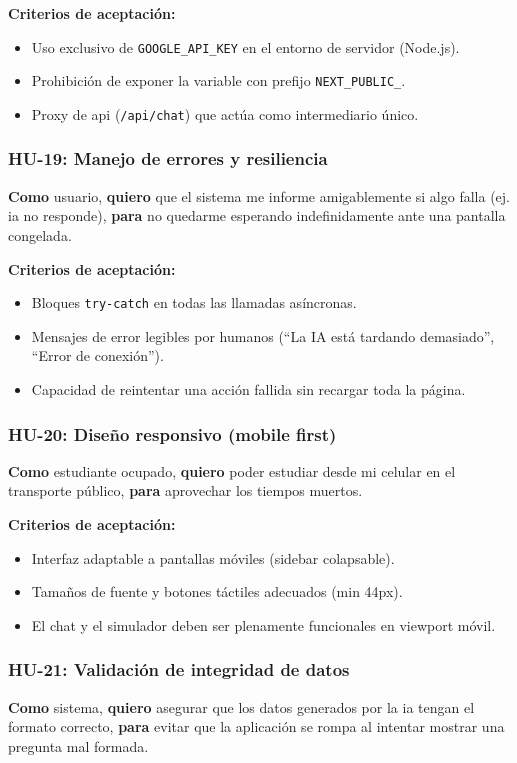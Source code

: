 \textbf{Criterios de aceptación:}
\begin{itemize}
\item Uso exclusivo de \texttt{GOOGLE\_API\_KEY} en el entorno de servidor (Node.js).
\item Prohibición de exponer la variable con prefijo \texttt{NEXT\_PUBLIC\_}.
\item Proxy de \gls{api} (\texttt{/api/chat}) que actúa como intermediario único.
\end{itemize}

\subsubsection{HU-19: Manejo de errores y resiliencia}
\textbf{Como} usuario,
\textbf{quiero} que el sistema me informe amigablemente si algo falla (ej. \gls{ia} no responde),
\textbf{para} no quedarme esperando indefinidamente ante una pantalla congelada.

\textbf{Criterios de aceptación:}
\begin{itemize}
\item Bloques \texttt{try-catch} en todas las llamadas asíncronas.
\item Mensajes de error legibles por humanos (\enquote{La IA está tardando demasiado}, \enquote{Error de conexión}).
\item Capacidad de reintentar una acción fallida sin recargar toda la página.
\end{itemize}

\subsubsection{HU-20: Diseño responsivo (mobile first)}
\textbf{Como} estudiante ocupado,
\textbf{quiero} poder estudiar desde mi celular en el transporte público,
\textbf{para} aprovechar los tiempos muertos.

\textbf{Criterios de aceptación:}
\begin{itemize}
\item Interfaz adaptable a pantallas móviles (sidebar colapsable).
\item Tamaños de fuente y botones táctiles adecuados (min 44px).
\item El chat y el simulador deben ser plenamente funcionales en viewport móvil.
\end{itemize}

\subsubsection{HU-21: Validación de integridad de datos}
\textbf{Como} sistema,
\textbf{quiero} asegurar que los datos generados por la \gls{ia} tengan el formato correcto,
\textbf{para} evitar que la aplicación se rompa al intentar mostrar una pregunta mal formada.

